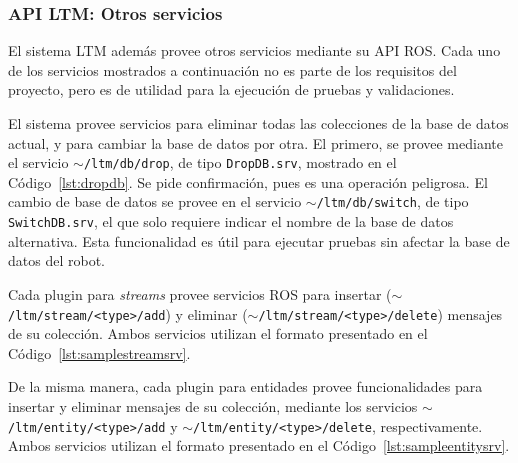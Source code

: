 \subsubsection{API LTM: Otros servicios}

El sistema LTM además provee otros servicios mediante su API ROS. Cada uno de los servicios mostrados a continuación no es parte de los requisitos del proyecto, pero es de utilidad para la ejecución de pruebas y validaciones.

El sistema provee servicios para eliminar todas las colecciones de la base de datos actual, y para cambiar la base de datos por otra. El primero, se provee mediante el servicio \texttt{$\sim$/ltm/db/drop}, de tipo \texttt{DropDB.srv}, mostrado en el Código~\ref{lst:dropdb}. Se pide confirmación, pues es una operación peligrosa. El cambio de base de datos se provee en el servicio  \texttt{$\sim$/ltm/db/switch}, de tipo \texttt{SwitchDB.srv}, el que solo requiere indicar el nombre de la base de datos alternativa. Esta funcionalidad es útil para ejecutar pruebas sin afectar la base de datos del robot.
\lstset{style=/Style/ROS/MSG}


Cada plugin para \textit{streams} provee servicios ROS para insertar (\texttt{$\sim$/ltm/stream/\textless type\textgreater/add}) y eliminar (\texttt{$\sim$/ltm/stream/\textless type\textgreater/delete}) mensajes de su colección. Ambos servicios utilizan el formato presentado en el Código~\ref{lst:samplestreamsrv}.

De la misma manera, cada plugin para entidades provee funcionalidades para insertar y eliminar mensajes de su colección, mediante los servicios \texttt{$\sim$/ltm/entity/\textless type\textgreater/add} y \texttt{$\sim$/ltm/entity/\textless type\textgreater/delete}, respectivamente. Ambos servicios utilizan el formato presentado en el Código~\ref{lst:sampleentitysrv}.




